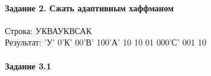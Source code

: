 \documentclass[a4paper, 12pt]{article}
\begin{document}
\pagebreak
\paragraph{Задание 2. Сжать адаптивным хаффманом\\}

Строка: 
УКВАУКВСАК\\
Результат: 'У' 0'К' 00'В' 100'А' 10 10 01 000'С' 001 10










\pagebreak
\paragraph{Задание 3.1}
\end{document}
